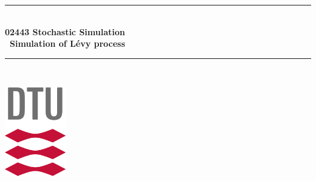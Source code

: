 

\begin{titlepage}

\newcommand{\HRule}{\rule{\linewidth}{0.5mm}} %

\center %
 





\HRule \\[0.8cm]
{\Large \bfseries 02443 Stochastic Simulation}\\[0.4cm]
{\huge \bfseries \ Simulation of Lévy process }
\HRule \\[0.5cm]
\vspace{1.5cm}



\includegraphics[width=0.2\textwidth]{figures/DTUlogo.png}\\[1.8cm] %
 

\end{titlepage}

